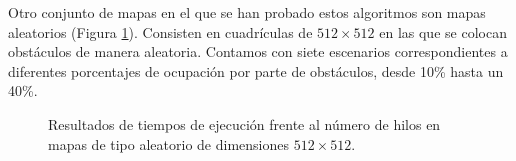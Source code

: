 \documentclass[a4paper,12pt]{article}
\begin{document}
Otro conjunto de mapas en el que se han probado estos algoritmos son mapas aleatorios (Figura \ref{random}). Consisten en cuadrículas de $512 \times 512$ en las que se colocan obstáculos de manera aleatoria. Contamos con siete escenarios correspondientes a diferentes porcentajes de ocupación por parte de obstáculos, desde 10\% hasta un 40\%. 

\begin{figure}[H]
    \centering
    \begin{subfigure}[b]{0.49\textwidth}
        
    \end{subfigure}
    \hfill
    \begin{subfigure}[b]{0.49\textwidth}
        
    \end{subfigure}

    \vspace{0.3em}
    
    \begin{subfigure}[b]{0.49\textwidth}
        
    \end{subfigure}
    \hfill
    \begin{subfigure}[b]{0.49\textwidth}
        
    \end{subfigure}

    \vspace{0.3em}

    \begin{subfigure}[b]{0.49\textwidth}
        
    \end{subfigure}
    \hfill
    \begin{subfigure}[b]{0.49\textwidth}
        
    \end{subfigure}

    \vspace{0.3em}

    \begin{subfigure}[b]{0.49\textwidth}
        
    \end{subfigure}

    \caption{Resultados de tiempos de ejecución frente al número de hilos en mapas de tipo aleatorio de dimensiones $512 \times 512$.}
    \label{random}
\end{figure}
\end{document}
